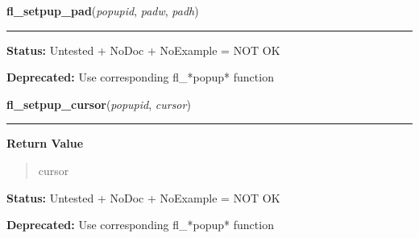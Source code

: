     \label{xformslib:library:fl_setpup_pad}

    \vspace{0.5ex}

\hspace{.8\funcindent}\begin{boxedminipage}{\funcwidth}

    \raggedright \textbf{fl\_setpup\_pad}(\textit{popupid}, \textit{padw}, \textit{padh})

    \vspace{-1.5ex}

    \rule{\textwidth}{0.5\fboxrule}
\setlength{\parskip}{2ex}
\setlength{\parskip}{1ex}
\textbf{Status:} Untested + NoDoc + NoExample = NOT OK



\textbf{Deprecated:} Use corresponding fl\_*popup* function



    \end{boxedminipage}

    \label{xformslib:library:fl_setpup_cursor}

    \vspace{0.5ex}

\hspace{.8\funcindent}\begin{boxedminipage}{\funcwidth}

    \raggedright \textbf{fl\_setpup\_cursor}(\textit{popupid}, \textit{cursor})

    \vspace{-1.5ex}

    \rule{\textwidth}{0.5\fboxrule}
\setlength{\parskip}{2ex}
\setlength{\parskip}{1ex}
      \textbf{Return Value}
    \vspace{-1ex}

      \begin{quote}
      cursor

      \end{quote}

\textbf{Status:} Untested + NoDoc + NoExample = NOT OK



\textbf{Deprecated:} Use corresponding fl\_*popup* function



    \end{boxedminipage}


